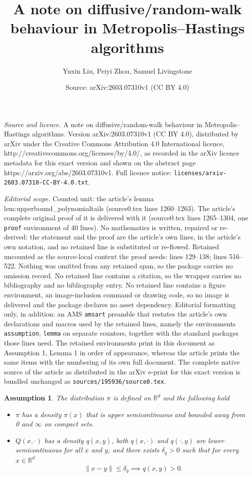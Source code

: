 \documentclass[10pt,a4paper]{amsart}
\title{\huge A note on diffusive/random-walk behaviour in Metropolis--Hastings algorithms}
\author{Yuxin Liu, Peiyi Zhou, Samuel Livingstone}
\date{Source: arXiv:2603.07310v1 (CC BY 4.0)}
\newtheorem{assumption}{Assumption}
\begin{document}
\maketitle

\noindent\emph{Source and licence.} \huge A note on diffusive/random-walk behaviour in Metropolis--Hastings algorithms. Version arXiv:2603.07310v1 (CC BY 4.0), distributed by arXiv under the Creative Commons Attribution 4.0 International licence, http://creativecommons.org/licenses/by/4.0/, as recorded in the arXiv licence metadata for this exact version and shown on the abstract page https://arxiv.org/abs/2603.07310v1. Full licence notice: \texttt{licenses/arxiv-2603.07310-CC-BY-4.0.txt}.\par\smallskip

\noindent\textit{Editorial scope.} Counted unit: the article's lemma lem:upperbound\_polynomialtails (source0.tex lines 1260--1263). The article's complete original proof of it is delivered with it (source0.tex lines 1265--1304, one \texttt{proof} environment of 40 lines). No mathematics is written, repaired or re-derived: the statement and the proof are the article's own lines, in the article's own notation, and no retained line is substituted or re-flowed.  Retained uncounted as the source-local context the proof needs: lines 129--138; lines 516--522.  Nothing was omitted from any retained span, so the package carries no omission record.  No retained line contains a citation, so the wrapper carries no bibliography and no bibliography entry.  No retained line contains a figure environment, an image-inclusion command or drawing code, so no image is delivered and the package declares no asset dependency.  Editorial formatting only, in addition: an AMS \texttt{amsart} preamble that restates the article's own declarations and macros used by the retained lines, namely the environments \texttt{assumption}, \texttt{lemma} on separate counters, together with the standard packages those lines need.  The retained environments print in this document as Assumption 1, Lemma 1 in order of appearance, whereas the article prints the same items with the numbering of its own full document.  The complete native source of the article as distributed in the arXiv e-print for this exact version is bundled unchanged as \texttt{sources/195936/source0.tex}.
\begin{assumption}
    The distribution $\pi$ is defined on $\mathbb{R}^d$ and the following hold
    \begin{itemize}
        \item[(i)] $\pi$ has a density $\pi(x)$ that is upper semicontinuous and bounded away from 0 and $\infty$ on compact sets.
        \item[(ii)] $Q(x,\cdot)$ has a density $q(x,y)$, both $q(x,\cdot)$ and $q(\cdot,y)$ are lower semicontinuous for all $x$ and $y$, and there exists $\delta_q > 0$ such that for every $x \in \mathbb{R}^d$ \[
    \|x-y\| \leq \delta_q \implies q(x,y) > 0.
    \]
    \end{itemize}
    \label{ass:pi_q_regularities}
\end{assumption}
\end{document}
